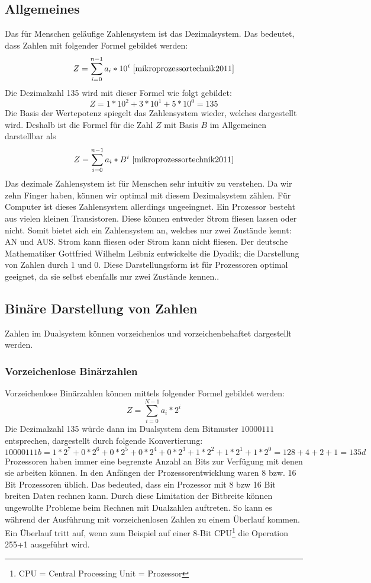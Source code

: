 \documentclass[12pt]{article}
\begin{document}
\subsection{Allgemeines}
Das für Menschen geläufige Zahlensystem ist das Dezimalsystem. Das bedeutet, dass Zahlen mit folgender Formel gebildet werden:
$$Z=\sum\limits_{i=0}^{n-1} a_i * 10^i \ \cite{mikroprozessortechnik2011}$$
Die Dezimalzahl 135 wird mit dieser Formel wie folgt gebildet:$$Z=1*10^2+3*10^1+5*10^0 = 135$$
Die Basis der Wertepotenz spiegelt das Zahlensystem wieder, welches dargestellt wird. Deshalb ist die Formel für die Zahl $Z$ mit Basis $B$ im Allgemeinen darstellbar als
$$Z=\sum\limits_{i=0}^{n-1} a_i * B^i \ \cite{mikroprozessortechnik2011}$$ 
Das dezimale Zahlensystem ist für Menschen sehr intuitiv zu verstehen. Da wir zehn Finger haben, können wir optimal mit diesem Dezimalsystem zählen. Für Computer ist dieses Zahlensystem allerdings ungeeingnet. Ein Prozessor besteht aus vielen kleinen Transistoren. Diese können entweder Strom fliesen lassen oder nicht. Somit bietet sich ein Zahlensystem an, welches nur zwei Zustände kennt: AN und AUS. Strom kann fliesen oder Strom kann nicht fliesen. Der deutsche Mathematiker Gottfried Wilhelm Leibniz entwickelte die Dyadik; die Darstellung von Zahlen durch 1 und 0. Diese Darstellungsform ist für Prozessoren optimal geeignet, da sie selbst ebenfalls nur zwei Zustände kennen.\cite{mikroprozessortechnik2011}.

\subsection{Binäre Darstellung von Zahlen}
Zahlen im Dualsystem können vorzeichenlos und vorzeichenbehaftet dargestellt werden.

\subsubsection{Vorzeichenlose Binärzahlen}
Vorzeichenlose Binärzahlen können mittels folgender Formel gebildet werden: $$Z=\sum\limits_{i=0}^{N-1} a_i * 2^i$$ 
Die Dezimalzahl 135 würde dann im Dualsystem dem Bitmuster $10000111$ entsprechen, dargestellt durch folgende Konvertierung:
$$10000111b = 1*2^7+0*2^6+0*2^5+0*2^4+0*2^3+1*2^2+1*2^1+1*2^0 = 128 +4+2+1 = 135d$$
Prozessoren haben immer eine begrenzte Anzahl an Bits zur Verfügung mit denen sie arbeiten können. In den Anfängen der Prozessorentwicklung waren 8 bzw. 16 Bit Prozessoren üblich. Das bedeuted, dass ein Prozessor mit 8 bzw 16 Bit breiten Daten rechnen kann. Durch diese Limitation der Bitbreite können ungewollte Probleme beim Rechnen mit Dualzahlen auftreten. So kann es während der Ausführung mit vorzeichenlosen Zahlen zu einem Überlauf kommen. Ein Überlauf tritt auf, wenn zum Beispiel auf einer 8-Bit CPU\footnote{CPU =  Central Processing Unit = Prozessor} die Operation 255+1 ausgeführt wird.
\end{document}
